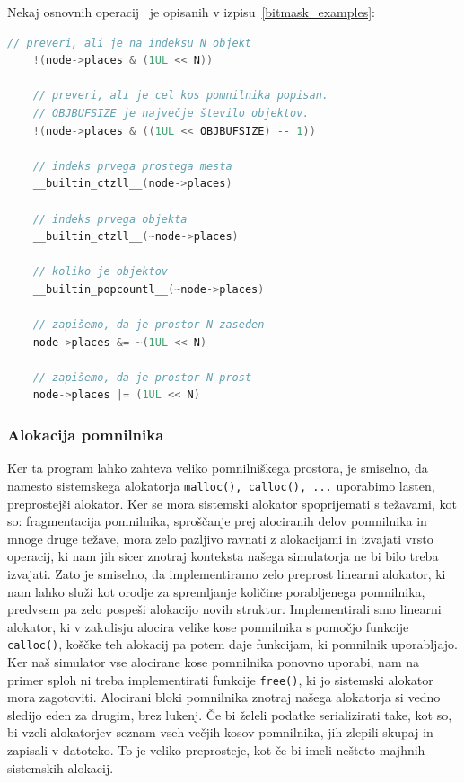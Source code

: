 \documentclass[a4paper,12pt]{article}
\begin{document}
\newpage
Nekaj osnovnih operacij~\cite{gcc_documentation} je opisanih v izpisu~\ref{bitmask_examples}:
\begin{lstlisting}[caption={Uporaba bitne maske za objekte}, label=bitmask_examples, language=C]
    // preveri, ali je na indeksu N objekt
    !(node->places & (1UL << N))

    // preveri, ali je cel kos pomnilnika popisan.
    // OBJBUFSIZE je največje število objektov.
    !(node->places & ((1UL << OBJBUFSIZE) -- 1)) 

    // indeks prvega prostega mesta
    __builtin_ctzll__(node->places)

    // indeks prvega objekta
    __builtin_ctzll__(~node->places)

    // koliko je objektov
    __builtin_popcountl__(~node->places)

    // zapišemo, da je prostor N zaseden
    node->places &= ~(1UL << N)

    // zapišemo, da je prostor N prost
    node->places |= (1UL << N)

\end{lstlisting}


\subsubsection{Alokacija pomnilnika}

Ker ta program lahko zahteva veliko pomnilniškega prostora, je smiselno, da namesto sistemskega
alokatorja \lstinline|malloc(), calloc(), ...| uporabimo lasten, preprostejši alokator.
Ker se mora sistemski alokator spoprijemati s težavami, kot so: fragmentacija pomnilnika, sproščanje
prej alociranih delov pomnilnika in mnoge druge težave, mora zelo pazljivo ravnati z alokacijami in
izvajati vrsto operacij, ki nam jih sicer znotraj konteksta našega simulatorja
ne bi bilo treba izvajati. Zato je smiselno, da implementiramo zelo preprost linearni alokator, ki nam lahko služi kot orodje
za spremljanje količine porabljenega pomnilnika, predvsem pa zelo pospeši alokacijo novih struktur.
Implementirali smo linearni alokator, ki v zakulisju alocira velike kose pomnilnika s pomočjo
funkcije \lstinline|calloc()|, koščke teh alokacij pa potem daje funkcijam, ki pomnilnik uporabljajo.
Ker naš simulator vse alocirane kose pomnilnika ponovno uporabi, nam na primer sploh ni treba implementirati
funkcije \lstinline|free()|, ki jo sistemski alokator mora zagotoviti. Alocirani bloki pomnilnika znotraj našega
alokatorja si vedno sledijo eden za drugim, brez lukenj. Če bi želeli podatke serializirati take, kot so,
bi vzeli alokatorjev seznam vseh večjih kosov pomnilnika, jih zlepili skupaj in zapisali v datoteko.
To je veliko preprosteje, kot če bi imeli nešteto majhnih sistemskih alokacij.
\end{document}
